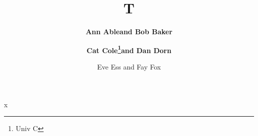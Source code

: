 \documentclass{article}
\begin{document}
\title{T}
\author{{\bf Ann Able\break and Bob Baker} \and {\bf Cat Cole\thanks{Univ C}and Dan Dorn}
  \and \sc Eve Ess \rm and \sc Fay Fox}
\maketitle
x
\end{document}
